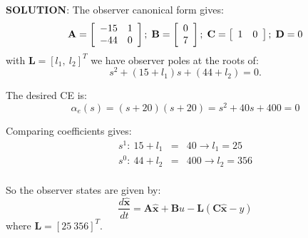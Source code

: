 \textbf{SOLUTION}:
The observer canonical form gives:
\[
{\bf{A}} = \left[ {\begin{array}{*{20}c}
   { - 15} & 1  \\
   { - 44} & 0  \\
\end{array}} \right];\;{\bf{B}} = \left[ {\begin{array}{*{20}c}
   0  \\
   7  \\
\end{array}} \right];\;{\bf{C}} = \left[ {\begin{array}{*{20}c}
   1 & 0  \\
\end{array}} \right];\;{\bf{D}} = 0
\]
with $\mathbf{L}=[l_1,\ l_2]^T$  we have observer poles at the roots of:
\[
s^2+(15+l_1)s+(44+l_2)=0.
\]
 

The desired CE is:
\[
\alpha_e(s)=(s + 20)(s + 20)=s^2+40s+400=0
\]

Comparing coefficients gives:
\begin{eqnarray*}
	s^1:\ 15 + l_1 & = & 40 \to l_1=25 \\
	s^0:\ 44 + l_2 & = & 400 \to l_2=356 \\	
\end{eqnarray*}
 

So the observer states are given by:
\[
\frac{d\hat{\mathbf{x}}}{dt}=\mathbf{A}\hat{\mathbf{x}}+\mathbf{B}u-\mathbf{L}(\mathbf{C}\hat{\mathbf{x}}-y)
\]
where $\mathbf{L}=[25\ 356]^T.$

